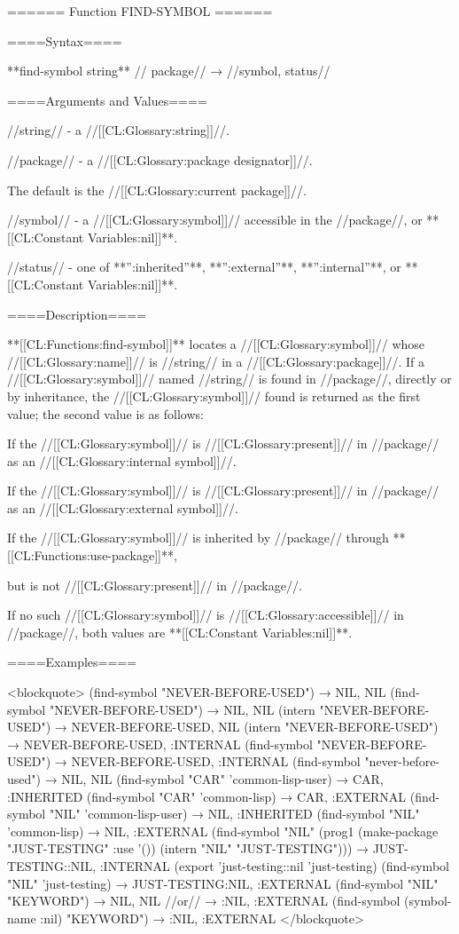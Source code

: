 ====== Function FIND-SYMBOL ======

====Syntax====

**find-symbol {string** //\opt} package// → //symbol, status//

====Arguments and Values====

//string// - a //[[CL:Glossary:string]]//.

//package// - a //[[CL:Glossary:package designator]]//.

The default is the //[[CL:Glossary:current package]]//.

//symbol// - a //[[CL:Glossary:symbol]]// accessible in the //package//, or **[[CL:Constant Variables:nil]]**.

//status// - one of **'':inherited''**, **'':external''**, **'':internal''**, or **[[CL:Constant Variables:nil]]**.

====Description====

**[[CL:Functions:find-symbol]]** locates a //[[CL:Glossary:symbol]]// whose //[[CL:Glossary:name]]// is //string// in a //[[CL:Glossary:package]]//. If a //[[CL:Glossary:symbol]]// named //string// is found in //package//, directly or by inheritance, the //[[CL:Glossary:symbol]]// found is returned as the first value; the second value is as follows:

\beginlist {}

If the //[[CL:Glossary:symbol]]// is //[[CL:Glossary:present]]// in //package// as an //[[CL:Glossary:internal symbol]]//.


If the //[[CL:Glossary:symbol]]// is //[[CL:Glossary:present]]// in //package// as an //[[CL:Glossary:external symbol]]//.


If the //[[CL:Glossary:symbol]]// is inherited by //package// through **[[CL:Functions:use-package]]**,

but is not //[[CL:Glossary:present]]// in //package//.

\endlist

If no such //[[CL:Glossary:symbol]]// is //[[CL:Glossary:accessible]]// in //package//, both values are **[[CL:Constant Variables:nil]]**.

====Examples====

<blockquote> (find-symbol "NEVER-BEFORE-USED") → NIL, NIL (find-symbol "NEVER-BEFORE-USED") → NIL, NIL (intern "NEVER-BEFORE-USED") → NEVER-BEFORE-USED, NIL (intern "NEVER-BEFORE-USED") → NEVER-BEFORE-USED, :INTERNAL (find-symbol "NEVER-BEFORE-USED") → NEVER-BEFORE-USED, :INTERNAL (find-symbol "never-before-used") → NIL, NIL (find-symbol "CAR" 'common-lisp-user) → CAR, :INHERITED (find-symbol "CAR" 'common-lisp) → CAR, :EXTERNAL (find-symbol "NIL" 'common-lisp-user) → NIL, :INHERITED (find-symbol "NIL" 'common-lisp) → NIL, :EXTERNAL (find-symbol "NIL" (prog1 (make-package "JUST-TESTING" :use '()) (intern "NIL" "JUST-TESTING"))) → JUST-TESTING::NIL, :INTERNAL (export 'just-testing::nil 'just-testing) (find-symbol "NIL" 'just-testing) → JUST-TESTING:NIL, :EXTERNAL (find-symbol "NIL" "KEYWORD") → NIL, NIL //or// → :NIL, :EXTERNAL (find-symbol (symbol-name :nil) "KEYWORD") → :NIL, :EXTERNAL </blockquote>

